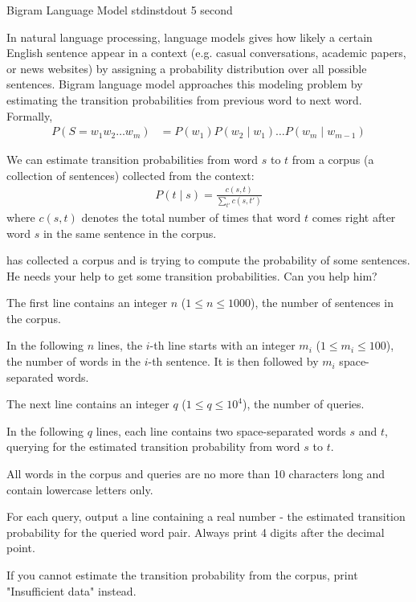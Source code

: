 
\begin{problem}{Bigram Language Model}
{stdin}{stdout}
{5 second}{}{}

In natural language processing, language models gives how likely a certain English sentence appear in a context (e.g. casual conversations, academic papers, or news websites) by assigning a probability distribution over all possible sentences. Bigram language model approaches this modeling problem by estimating the transition probabilities from previous word to next word. Formally, 
\begin{align*}
	P(S = w_1 w_2 \hdots w_m) &= P(w_1)P(w_2 \mid w_1) \hdots P(w_m \mid w_{m-1})
\end{align*}

We can estimate transition probabilities from word $s$ to $t$ from a corpus (a collection of sentences) collected from the context: 
\begin{align*}
	P(t \mid s) = \frac{c(s,t)}{\sum_{t'}{c(s,t')}}
\end{align*}
where $c(s,t)$ denotes the total number of times that word $t$ comes right after word $s$ in the same sentence in the corpus. 

\Suzukaze has collected a corpus and is trying to compute the probability of some sentences. He needs your help to get some transition probabilities. Can you help him? 

\InputFile

The first line contains an integer $n$ ($1 \le n \le 1000$), the number of sentences in the corpus. 

In the following $n$ lines, the $i$-th line starts with an integer $m_i$ ($1 \le m_i \le 100$), the number of words in the $i$-th sentence. It is then followed by $m_i$ space-separated words. 

The next line contains an integer $q$ ($1 \le q \le 10^4$), the number of queries. 

In the following $q$ lines, each line contains two space-separated words $s$ and $t$, querying for the estimated transition probability from word $s$ to $t$. 

All words in the corpus and queries are no more than 10 characters long and contain lowercase letters only. 

\OutputFile

For each query, output a line containing a real number - the estimated transition probability for the queried word pair. Always print 4 digits after the decimal point. 

If you cannot estimate the transition probability from the corpus, print "Insufficient data" instead. 

\Examples

\begin{example}
%
\end{example}

\end{problem}